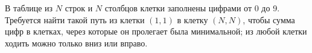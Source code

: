 В таблице из $N$ строк и $N$ столбцов клетки заполнены цифрами от 0 до 9. Требуется найти такой путь из клетки $(1, 1)$ в клетку $(N, N)$, чтобы сумма цифр в клетках, через которые он пролегает была минимальной; из любой клетки ходить можно только вниз или вправо.